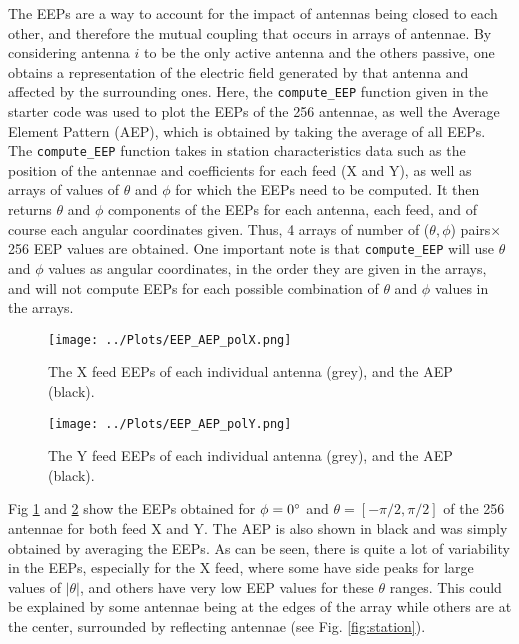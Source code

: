 \documentclass[12pt]{report} %
\begin{document}
The EEPs are a way to account for the impact of antennas being closed to each other, and therefore the mutual coupling that occurs in arrays of antennae\cite{borg2020on-sky}\cite{antenna_theory}. By considering antenna $i$ to be the only active antenna and the others passive, one obtains a representation of the electric field generated by that antenna and affected by the surrounding ones\cite{borg2020on-sky}. Here, the \texttt{compute\_EEP} function given in the starter code was used to plot the EEPs of the 256 antennae, as well the Average Element Pattern (AEP), which is obtained by taking the average of all EEPs. The \texttt{compute\_EEP} function takes in station characteristics data such as the position of the antennae and coefficients for each feed (X and Y), as well as arrays of values of $\theta$ and $\phi$ for which the EEPs need to be computed. It then returns $\theta$ and $\phi$ components of the EEPs for each antenna, each feed, and of course each angular coordinates given. Thus, 4 arrays of number of ($\theta,\phi$) pairs$\times$256 EEP values are obtained. One important note is that \texttt{compute\_EEP} will use $\theta$ and $\phi$ values as angular coordinates, in the order they are given in the arrays, and will not compute EEPs for each possible combination of $\theta$ and $\phi$ values in the arrays.

\begin{figure}[h]
    \centering
    \texttt{[image: ../Plots/EEP\_AEP\_polX.png]}
    \caption{The X feed EEPs of each individual antenna (grey), and the AEP (black).}
    \label{fig:EEPs1}
\end{figure}

\begin{figure}[h]
    \centering
    \texttt{[image: ../Plots/EEP\_AEP\_polY.png]}
    \caption{The Y feed EEPs of each individual antenna (grey), and the AEP (black).}
    \label{fig:EEPs2}
\end{figure}


Fig \ref{fig:EEPs1} and \ref{fig:EEPs2} show the EEPs obtained for $\phi = 0\degree$ and $\theta = [-\pi/2, \pi/2]$ of the 256 antennae for both feed X and Y. The AEP is also shown in black and was simply obtained by averaging the EEPs. As can be seen, there is quite a lot of variability in the EEPs, especially for the X feed, where some have side peaks for large values of $|\theta|$, and others have very low EEP values for these $\theta$ ranges. This could be explained by some antennae being at the edges of the array while others are at the center, surrounded by reflecting antennae (see Fig. \ref{fig:station}).
\end{document}
